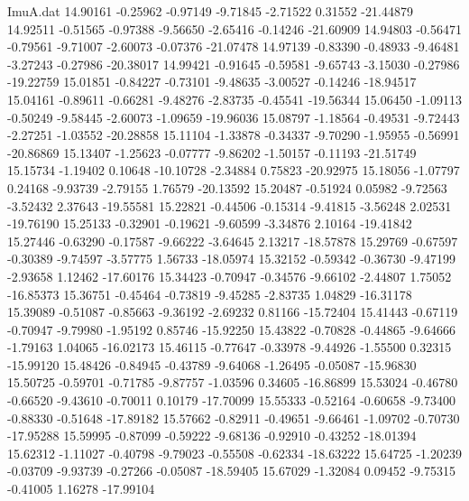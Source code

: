 \begin{filecontents}{ImuA.dat}
  14.90161   -0.25962   -0.97149   -9.71845   -2.71522    0.31552  -21.44879
  14.92511   -0.51565   -0.97388   -9.56650   -2.65416   -0.14246  -21.60909
  14.94803   -0.56471   -0.79561   -9.71007   -2.60073   -0.07376  -21.07478
  14.97139   -0.83390   -0.48933   -9.46481   -3.27243   -0.27986  -20.38017
  14.99421   -0.91645   -0.59581   -9.65743   -3.15030   -0.27986  -19.22759
  15.01851   -0.84227   -0.73101   -9.48635   -3.00527   -0.14246  -18.94517
  15.04161   -0.89611   -0.66281   -9.48276   -2.83735   -0.45541  -19.56344
  15.06450   -1.09113   -0.50249   -9.58445   -2.60073   -1.09659  -19.96036
  15.08797   -1.18564   -0.49531   -9.72443   -2.27251   -1.03552  -20.28858
  15.11104   -1.33878   -0.34337   -9.70290   -1.95955   -0.56991  -20.86869
  15.13407   -1.25623   -0.07777   -9.86202   -1.50157   -0.11193  -21.51749
  15.15734   -1.19402    0.10648  -10.10728   -2.34884    0.75823  -20.92975
  15.18056   -1.07797    0.24168   -9.93739   -2.79155    1.76579  -20.13592
  15.20487   -0.51924    0.05982   -9.72563   -3.52432    2.37643  -19.55581
  15.22821   -0.44506   -0.15314   -9.41815   -3.56248    2.02531  -19.76190
  15.25133   -0.32901   -0.19621   -9.60599   -3.34876    2.10164  -19.41842
  15.27446   -0.63290   -0.17587   -9.66222   -3.64645    2.13217  -18.57878
  15.29769   -0.67597   -0.30389   -9.74597   -3.57775    1.56733  -18.05974
  15.32152   -0.59342   -0.36730   -9.47199   -2.93658    1.12462  -17.60176
  15.34423   -0.70947   -0.34576   -9.66102   -2.44807    1.75052  -16.85373
  15.36751   -0.45464   -0.73819   -9.45285   -2.83735    1.04829  -16.31178
  15.39089   -0.51087   -0.85663   -9.36192   -2.69232    0.81166  -15.72404
  15.41443   -0.67119   -0.70947   -9.79980   -1.95192    0.85746  -15.92250
  15.43822   -0.70828   -0.44865   -9.64666   -1.79163    1.04065  -16.02173
  15.46115   -0.77647   -0.33978   -9.44926   -1.55500    0.32315  -15.99120
  15.48426   -0.84945   -0.43789   -9.64068   -1.26495   -0.05087  -15.96830
  15.50725   -0.59701   -0.71785   -9.87757   -1.03596    0.34605  -16.86899
  15.53024   -0.46780   -0.66520   -9.43610   -0.70011    0.10179  -17.70099
  15.55333   -0.52164   -0.60658   -9.73400   -0.88330   -0.51648  -17.89182
  15.57662   -0.82911   -0.49651   -9.66461   -1.09702   -0.70730  -17.95288
  15.59995   -0.87099   -0.59222   -9.68136   -0.92910   -0.43252  -18.01394
  15.62312   -1.11027   -0.40798   -9.79023   -0.55508   -0.62334  -18.63222
  15.64725   -1.20239   -0.03709   -9.93739   -0.27266   -0.05087  -18.59405
  15.67029   -1.32084    0.09452   -9.75315   -0.41005    1.16278  -17.99104

\end{filecontents}
